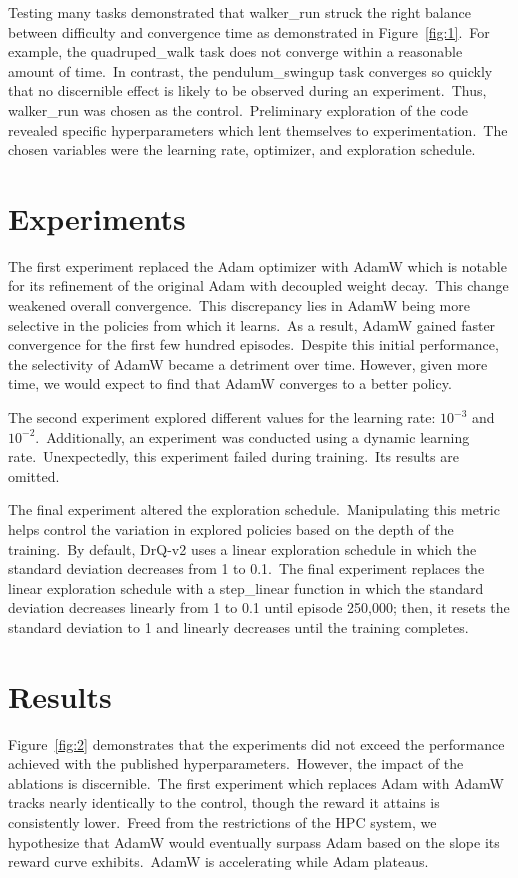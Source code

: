 \documentclass[conference]{./IEEEtran/IEEEtran} %
\begin{document}
    Testing many tasks demonstrated that walker\_run struck the right balance between difficulty and convergence time as
    demonstrated in Figure~\ref{fig:1}.\ For example, the quadruped\_walk task does not converge within a reasonable
    amount of time.\ In contrast, the pendulum\_swingup task converges so quickly that no discernible effect is likely
    to be observed during an experiment.\ Thus, walker\_run was chosen as the control.\ Preliminary exploration of the
    code revealed specific hyperparameters which lent themselves to experimentation.\ The chosen variables were the
    learning rate, optimizer, and exploration schedule.

    \section{Experiments}\label{sec:experiments}
    The first experiment replaced the Adam optimizer with AdamW which is notable for its refinement of the original Adam
    with decoupled weight decay.\ This change weakened overall convergence.\ This discrepancy lies in AdamW being more
    selective in the policies from which it learns.\ As a result, AdamW gained faster convergence for the first few
    hundred episodes.\ Despite this initial performance, the selectivity of AdamW became a detriment over time.
    However, given more time, we would expect to find that AdamW converges to a better policy.

    The second experiment explored different values for the learning rate: $10^{-3}$ and $10^{-2}$.\ Additionally, an
    experiment was conducted using a dynamic learning rate.\ Unexpectedly, this experiment failed during training.\ Its
    results are omitted.
    
    The final experiment altered the exploration schedule.\ Manipulating this metric helps control the variation in
    explored policies based on the depth of the training.\ By default, DrQ-v2 uses a linear exploration schedule in
    which the standard deviation decreases from 1 to 0.1.\ The final experiment replaces the linear exploration schedule
    with a step\_linear function in which the standard deviation decreases linearly from 1 to 0.1 until episode 250,000;
    then, it resets the standard deviation to 1 and linearly decreases until the training completes.
    
    \section{Results}\label{sec:results}
    Figure~\ref{fig:2} demonstrates that the experiments did not exceed the performance achieved with the published
    hyperparameters.\ However, the impact of the ablations is discernible.\ The first experiment which replaces Adam
    with AdamW tracks nearly identically to the control, though the reward it attains is consistently lower.\ Freed from
    the restrictions of the HPC system, we hypothesize that AdamW would eventually surpass Adam based on the slope its
    reward curve exhibits.\ AdamW is accelerating while Adam plateaus.
\end{document}
